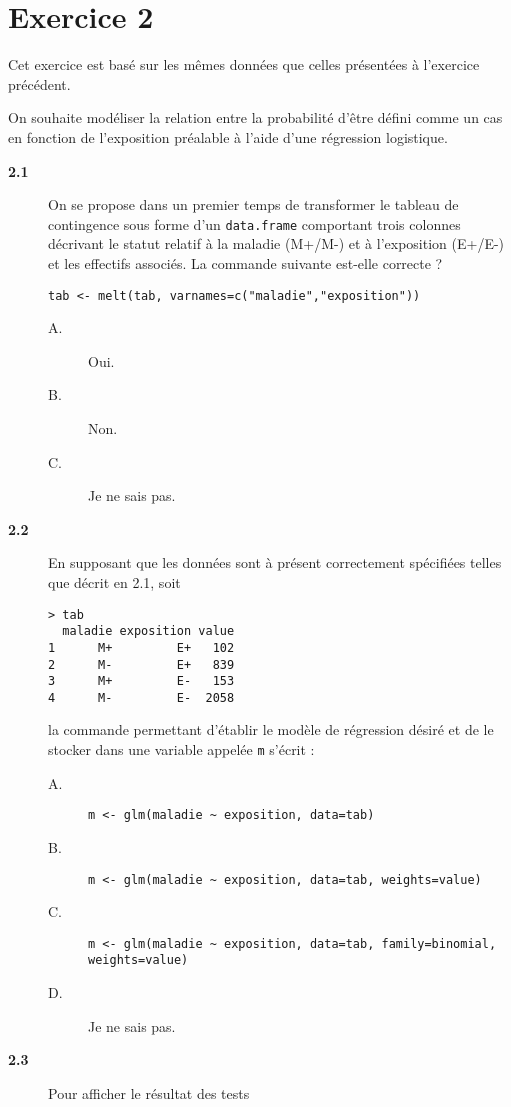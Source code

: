 \documentclass[11pt]{report}
\theoremstyle{definition}
\begin{document}
\section*{Exercice 2}
Cet exercice est basé sur les mêmes données que celles présentées à
l'exercice précédent.

On souhaite modéliser la relation entre la probabilité d'être défini comme
un cas en fonction de l'exposition préalable à l'aide d'une régression
logistique.
  
\begin{description}
\item[\bf 2.1]  On se propose dans un premier temps
  de transformer le tableau de contingence sous forme d'un
  \texttt{data.frame} comportant trois colonnes décrivant le statut relatif
  à la maladie (M+/M-) et à l'exposition (E+/E-) et les effectifs
  associés. La commande suivante est-elle correcte ?
\begin{verbatim}
tab <- melt(tab, varnames=c("maladie","exposition"))
\end{verbatim}
  \begin{description}
  \item[A.] Oui.
  \item[B.] Non.
  \item[C.] Je ne sais pas.
  \end{description}
\item[\bf 2.2]  En supposant que les données sont à
  présent correctement spécifiées telles que décrit en 2.1, soit
\begin{verbatim}
> tab
  maladie exposition value
1      M+         E+   102
2      M-         E+   839
3      M+         E-   153
4      M-         E-  2058
\end{verbatim}
  la commande permettant d'établir le modèle de régression désiré et de le
  stocker dans une variable appelée \texttt{m} s'écrit :
  \begin{description}
  \item[A.] \verb|m <- glm(maladie ~ exposition, data=tab)|
  \item[B.] \verb|m <- glm(maladie ~ exposition, data=tab, weights=value)|
  \item[C.] \verb|m <- glm(maladie ~ exposition, data=tab, family=binomial, weights=value)|
  \item[D.] Je ne sais pas.
  \end{description}
\item[\bf 2.3]  Pour afficher le résultat des tests

\end{description}
\end{document}
